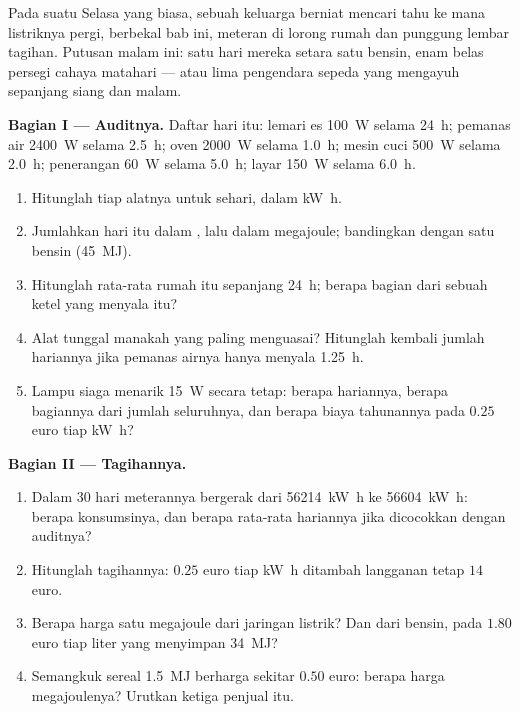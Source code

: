 \begin{problem}
\label{pb:g10:energy-conservation:1}
Pada suatu Selasa yang biasa, sebuah keluarga berniat mencari tahu ke
mana listriknya pergi, berbekal bab ini, meteran di lorong rumah dan
punggung lembar tagihan. Putusan malam ini: satu hari mereka setara
satu  bensin, enam belas  persegi cahaya matahari --- atau
lima pengendara sepeda yang mengayuh sepanjang siang dan malam.

\medskip
\noindent\textbf{Bagian I --- Auditnya.}
Daftar hari itu: lemari es \qty{100}{W} selama \qty{24}{h}; pemanas air
\qty{2400}{W} selama \qty{2.5}{h}; oven \qty{2000}{W} selama
\qty{1.0}{h}; mesin cuci \qty{500}{W} selama \qty{2.0}{h}; penerangan
\qty{60}{W} selama \qty{5.0}{h}; layar \qty{150}{W} selama \qty{6.0}{h}.
\begin{enumerate}
  \item Hitunglah  tiap alatnya untuk sehari, dalam \unit{kW.h}.
  \item Jumlahkan hari itu dalam , lalu dalam megajoule;
        bandingkan dengan satu  bensin (\qty{45}{MJ}).
  \item Hitunglah  rata-rata rumah itu sepanjang \qty{24}{h};
        berapa bagian dari sebuah ketel yang menyala itu?
  \item Alat tunggal manakah yang paling menguasai? Hitunglah kembali
        jumlah hariannya jika pemanas airnya hanya menyala \qty{1.25}{h}.
  \item Lampu siaga menarik \qty{15}{W} secara tetap: berapa 
        hariannya, berapa bagiannya dari jumlah seluruhnya, dan berapa
        biaya tahunannya pada $0.25$ euro tiap \unit{kW.h}?
\end{enumerate}

\medskip
\noindent\textbf{Bagian II --- Tagihannya.}
\begin{enumerate}[resume]
  \item Dalam 30 hari meterannya bergerak dari \qty{56214}{kW.h} ke
        \qty{56604}{kW.h}: berapa konsumsinya, dan berapa rata-rata
        hariannya jika dicocokkan dengan auditnya?
  \item Hitunglah tagihannya: $0.25$ euro tiap \unit{kW.h} ditambah
        langganan tetap $14$ euro.
  \item Berapa harga satu megajoule dari jaringan listrik? Dan dari
        bensin, pada $1.80$ euro tiap liter yang menyimpan
        \qty{34}{MJ}?
  \item Semangkuk sereal \qty{1.5}{MJ} berharga sekitar $0.50$ euro:
        berapa harga megajoulenya? Urutkan ketiga penjual  itu.
\end{enumerate}


\end{problem}
